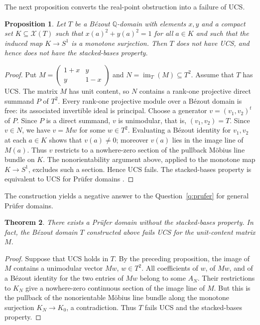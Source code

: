 \documentclass[11pt]{amsart}
\newtheorem{theorem}{Theorem}[section]
\newtheorem{proposition}[theorem]{Proposition}
\theoremstyle{definition}
\theoremstyle{remark}
\begin{document}
The next proposition converts the real-point obstruction into a failure of UCS.
\begin{proposition}
\label{prop:mobius}
Let $T$ be a B\'ezout $\mathbb Q$-domain with elements $x,y$ and a
compact set $K\subseteq\mathcal X(T)$ such that $x(a)^2+y(a)^2=1$
for all $a\in K$ and such that the induced map $K\to S^1$ is a
monotone surjection. Then $T$ does not have UCS, and hence does not
have the stacked-bases property.
\end{proposition}
\begin{proof}
Put $M=\left(\begin{smallmatrix}1+x&y\\y&1-x\end{smallmatrix}\right)$
and $N=\operatorname{im}_T(M)\subseteq T^2$.
Assume that $T$ has UCS. The matrix $M$ has unit content, so
$N$ contains a rank-one projective direct summand $P$ of $T^2$.
Every rank-one projective module over a B\'ezout domain is free:
its associated invertible ideal is principal. Choose a generator
$v=(v_1,v_2)^t$ of $P$. Since $P$ is a direct summand, $v$ is
unimodular, that is, $(v_1,v_2)=T$. Since $v\in N$, we have
$v=Mw$ for some $w\in T^2$. Evaluating a B\'ezout identity for
$v_1,v_2$ at each $a\in K$ shows that $v(a)\neq0$; moreover
$v(a)$ lies in the image line of $M(a)$. Thus $v$ restricts to a
nowhere-zero section of the pullback M\"obius line bundle on $K$.
The nonorientability argument above, applied to the monotone map
$K\to S^1$, excludes such a section. Hence UCS fails. The
stacked-bases property is equivalent to UCS for Pr\"ufer domains
\cite{BKU1987,BoulangerChabert2020}.
\end{proof}

The construction yields a negative answer to the Question~\ref{q:prufer} for general Pr\"ufer domains.
\begin{theorem}\label{thm:IX3negative}
There exists a Pr\"ufer domain without the stacked-bases property.
In fact, the B\'ezout domain $T$ constructed above fails UCS for the
unit-content matrix $M$.
\end{theorem}
\begin{proof}
Suppose that UCS holds in $T$. By the preceding proposition, the image
of $M$ contains a unimodular vector $Mw$, $w\in T^2$. All
coefficients of $w$, of $Mw$, and of a B\'ezout identity for the
two entries of $Mw$ belong to some $A_N$. Their restrictions to
$K_N$ give a nowhere-zero continuous section of the image line of
$M$. But this is the pullback of the nonorientable M\"obius line
bundle along the monotone surjection $K_N\to K_0$, a contradiction.
Thus $T$ fails UCS and the stacked-bases property.
\end{proof}
\end{document}

